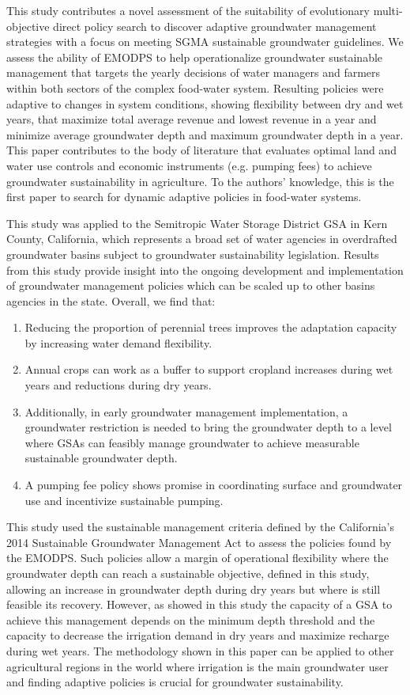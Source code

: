 \documentclass[a4paper,fleqn]{cas-sc}
\begin{document}
This study contributes a novel assessment of the suitability of evolutionary multi-objective direct policy search to discover adaptive groundwater management strategies with a focus on meeting SGMA sustainable groundwater guidelines. We assess the ability of EMODPS to help operationalize groundwater sustainable management that targets the yearly decisions of water managers and farmers within both sectors of the complex food-water system. Resulting policies were adaptive to changes in system conditions, showing flexibility between dry and wet years, that maximize total average revenue and lowest revenue in a year and minimize average groundwater depth and maximum groundwater depth in a year. This paper contributes to the body of literature that evaluates optimal land and water use controls and economic instruments (e.g. pumping fees) to achieve groundwater sustainability in agriculture. To the authors’ knowledge, this is the first paper to search for dynamic adaptive policies in food-water systems.  

This study was applied to the Semitropic Water Storage District GSA in Kern County, California, which represents a broad set of water agencies in overdrafted groundwater basins subject to groundwater sustainability legislation. Results from this study provide insight into the ongoing development and implementation of groundwater management policies which can be scaled up to other basins agencies in the state. Overall, we find that:  

\begin{enumerate}
    \item   Reducing the proportion of perennial trees improves the adaptation capacity by increasing water demand flexibility.  
    \item  Annual crops can work as a buffer to support cropland increases during wet years and reductions during dry years.
    \item  Additionally, in early groundwater management implementation, a groundwater restriction is needed to bring the groundwater depth to a level where GSAs can feasibly manage groundwater to achieve measurable sustainable groundwater depth.
    \item  A pumping fee policy shows promise in coordinating surface and groundwater use and incentivize sustainable pumping. 
\end{enumerate}

This study used the sustainable management criteria defined by the California’s 2014 Sustainable Groundwater Management Act to assess the policies found by the EMODPS. Such policies allow a margin of operational flexibility where the groundwater depth can reach a sustainable objective, defined in this study, allowing an increase in groundwater depth during dry years but where is still feasible its recovery. However, as showed in this  study the capacity of a GSA to achieve this management depends on the minimum depth threshold and the capacity to decrease the irrigation demand in dry years and maximize recharge during wet years. The methodology shown in this paper can be applied to other agricultural regions in the world where irrigation is the main groundwater user and finding adaptive policies is crucial for groundwater sustainability. 
\end{document}
